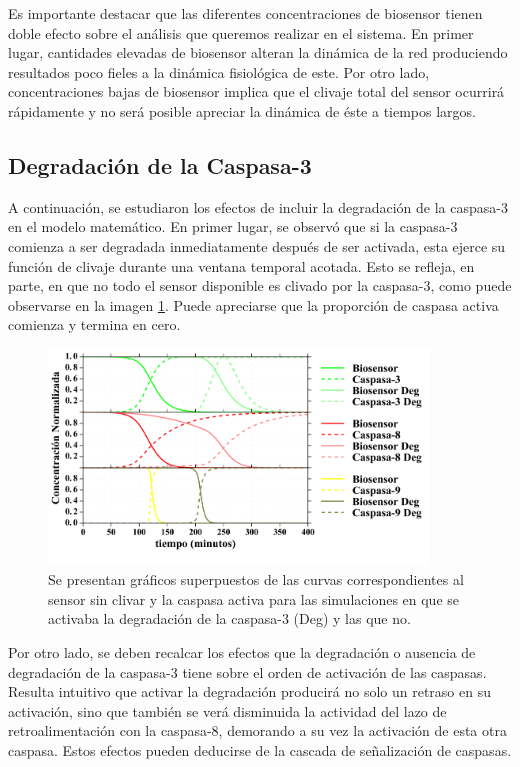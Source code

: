 Es importante destacar que las diferentes concentraciones de biosensor tienen doble efecto sobre el análisis que queremos realizar en el sistema. En primer lugar, cantidades elevadas de biosensor alteran la dinámica de la red produciendo resultados poco fieles a la dinámica fisiológica de este. Por otro lado, concentraciones bajas de biosensor implica que el clivaje total del sensor ocurrirá rápidamente y no será posible apreciar la dinámica de éste a tiempos largos.

\subsection{Degradación de la Caspasa-3}

A continuación, se estudiaron los efectos de incluir la degradación de la caspasa-3 en el modelo matemático. En primer lugar, se observó que si la caspasa-3 comienza a ser degradada inmediatamente después de ser activada, esta ejerce su función de clivaje durante una ventana temporal acotada. Esto se refleja, en parte, en que no todo el sensor disponible es clivado por la caspasa-3, como puede observarse en la imagen \ref{fig:deg_casp3}. Puede apreciarse que la proporción de caspasa activa comienza y termina en cero.

\begin{figure}
    \centering
    \includegraphics[width=0.9\textwidth]{./img/Cap3/ConSinDeg.png}
    \caption{Se presentan gráficos superpuestos de las curvas correspondientes al sensor sin clivar y la caspasa activa para las simulaciones en que se activaba la degradación de la caspasa-3 (Deg) y las que no.}
    \label{fig:deg_casp3}
\end{figure}

Por otro lado, se deben recalcar los efectos que la degradación o ausencia de degradación de la caspasa-3 tiene sobre el orden de activación de las caspasas. Resulta intuitivo que activar la degradación producirá no solo un retraso en su activación, sino que también se verá disminuida la actividad del lazo de retroalimentación con la caspasa-8, demorando a su vez la activación de esta otra caspasa. Estos efectos pueden deducirse de la cascada de señalización de caspasas.


